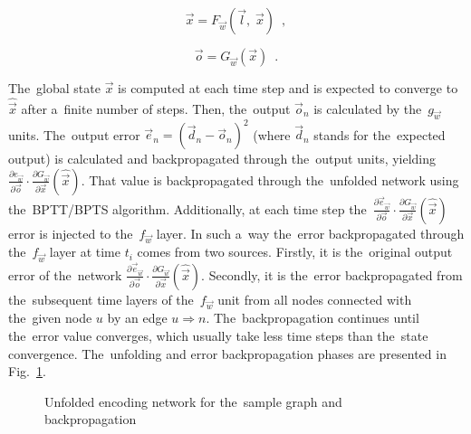 \documentclass{llncs}
\begin{document}
\begin{equation}
\vec{x} = F_{\vec{w}}(\vec{l}, \; \vec{x}) \enspace ,
\label{eq:gnn_fglobal}
\end{equation}

\begin{equation}
\vec{o} = G_{\vec{w}}(\vec{x}) \enspace .
\label{eq:gnn_gglobal}
\end{equation}

The~global state $\vec{x}$ is computed at each time step and is expected to converge to $\hat{\vec{x}}$ after a~finite number of steps. Then, the~output $\vec{o}_n$ is calculated by the~$g_{\vec{w}}$ units. The~output error $\vec{e}_n = (\vec{d}_n - \vec{o}_n)^2$ (where $\vec{d}_n$ stands for the~expected output) is calculated and backpropagated through the~output units, yielding $\frac{\partial e_{\vec{w}}}{\partial \vec{o}}\cdot \frac{\partial G_{\vec{w}}}{\partial \vec{x}}(\hat{\vec{x}})$. That value is backpropagated through the~unfolded network using the~BPTT/BPTS algorithm. Additionally, at each time step the~$\frac{\partial \vec{e}_{\vec{w}}}{\partial \vec{o}}\cdot \frac{\partial G_{\vec{w}}}{\partial \vec{x}}(\hat{\vec{x}})$ error is injected to the~$f_{\vec{w}}$ layer. In such a~way the~error backpropagated through the~$f_{\vec{w}}$ layer at time $t_i$ comes from two sources. Firstly, it is the~original output error of the~network $\frac{\partial \vec{e}_{\vec{w}}}{\partial \vec{o}}\cdot \frac{\partial G_{\vec{w}}}{\partial \vec{x}}(\hat{\vec{x}})$. Secondly, it is the~error backpropagated from the~subsequent time layers of the~$f_{\vec{w}}$ unit from all nodes connected with the~given node $u$ by an edge $u \Rightarrow n$. The~backpropagation continues until the~error value converges, which usually take less time steps than the~state convergence. The~unfolding and error backpropagation phases are presented in Fig.~\ref{fig:gnn_forback}.

\begin{figure}[h!]
\begin{center}
	\caption[]{Unfolded encoding network for the~sample graph and backpropagation}
	\label{fig:gnn_forback}
\end{center}
\end{figure}
\end{document}
